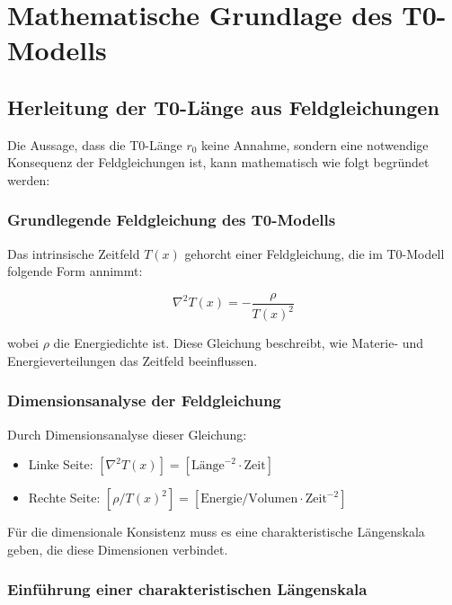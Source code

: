 \documentclass[12pt,a4paper]{article}
\newcommand{\Tfield}{T(x)}
\begin{document}
	\section{Mathematische Grundlage des T0-Modells}
	
	\subsection{Herleitung der T0-Länge aus Feldgleichungen}
	
	Die Aussage, dass die T0-Länge \(r_0\) keine Annahme, sondern eine notwendige Konsequenz der Feldgleichungen ist, kann mathematisch wie folgt begründet werden:
	
	\subsubsection{Grundlegende Feldgleichung des T0-Modells}
	
	Das intrinsische Zeitfeld \(\Tfield\) gehorcht einer Feldgleichung, die im T0-Modell folgende Form annimmt:
	
	\begin{equation}
		\nabla^2\Tfield = -\frac{\rho}{\Tfield^2}
	\end{equation}
	
	wobei \(\rho\) die Energiedichte ist. Diese Gleichung beschreibt, wie Materie- und Energieverteilungen das Zeitfeld beeinflussen.
	
	\subsubsection{Dimensionsanalyse der Feldgleichung}
	
	Durch Dimensionsanalyse dieser Gleichung:
	\begin{itemize}
		\item Linke Seite: \([\nabla^2\Tfield] = [\text{Länge}^{-2} \cdot \text{Zeit}]\)
		\item Rechte Seite: \([\rho/\Tfield^2] = [\text{Energie/Volumen} \cdot \text{Zeit}^{-2}]\)
	\end{itemize}
	
	Für die dimensionale Konsistenz muss es eine charakteristische Längenskala geben, die diese Dimensionen verbindet.
	
	\subsubsection{Einführung einer charakteristischen Längenskala}
	
\end{document}
